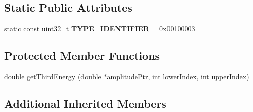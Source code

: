 \subsection*{Static Public Attributes}
\begin{DoxyCompactItemize}
\item 
\hypertarget{classspeech_1_1vectorizer_1_1ThirdsPowerVectorizer_a1390e6e6e099b5f573ec1f47b5d76f76}{static const uint32\+\_\+t {\bfseries T\+Y\+P\+E\+\_\+\+I\+D\+E\+N\+T\+I\+F\+I\+E\+R} = 0x00100003}\label{classspeech_1_1vectorizer_1_1ThirdsPowerVectorizer_a1390e6e6e099b5f573ec1f47b5d76f76}

\end{DoxyCompactItemize}
\subsection*{Protected Member Functions}
\begin{DoxyCompactItemize}
\item 
double \hyperlink{classspeech_1_1vectorizer_1_1ThirdsPowerVectorizer_acf6519f34d3bd003d09a62ae0b42fcb9}{get\+Third\+Energy} (double $\ast$amplitude\+Ptr, int lower\+Index, int upper\+Index)
\end{DoxyCompactItemize}
\subsection*{Additional Inherited Members}


